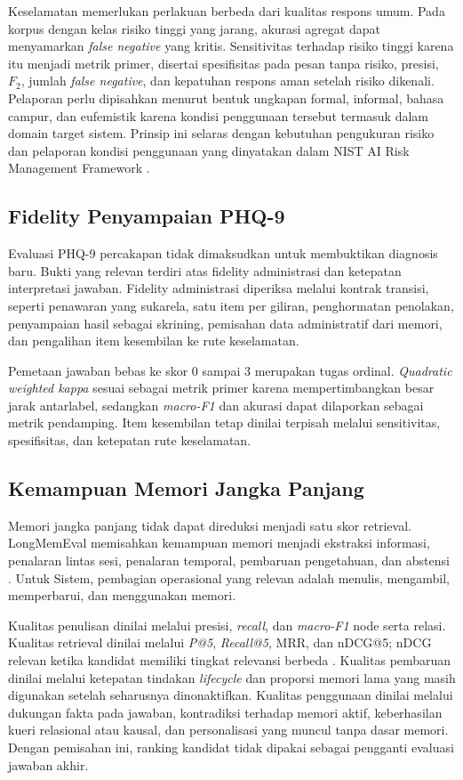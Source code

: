 Keselamatan memerlukan perlakuan berbeda dari kualitas respons umum. Pada korpus dengan kelas risiko tinggi yang jarang, akurasi agregat dapat menyamarkan \textit{false negative} yang kritis. Sensitivitas terhadap risiko tinggi karena itu menjadi metrik primer, disertai spesifisitas pada pesan tanpa risiko, presisi, $F_2$, jumlah \textit{false negative}, dan kepatuhan respons aman setelah risiko dikenali. Pelaporan perlu dipisahkan menurut bentuk ungkapan formal, informal, bahasa campur, dan eufemistik karena kondisi penggunaan tersebut termasuk dalam domain target sistem. Prinsip ini selaras dengan kebutuhan pengukuran risiko dan pelaporan kondisi penggunaan yang dinyatakan dalam NIST AI Risk Management Framework \parencite{nistAirmf2023}.

\subsection{Fidelity Penyampaian PHQ-9}

Evaluasi PHQ-9 percakapan tidak dimaksudkan untuk membuktikan diagnosis baru. Bukti yang relevan terdiri atas fidelity administrasi dan ketepatan interpretasi jawaban. Fidelity administrasi diperiksa melalui kontrak transisi, seperti penawaran yang sukarela, satu item per giliran, penghormatan penolakan, penyampaian hasil sebagai skrining, pemisahan data administratif dari memori, dan pengalihan item kesembilan ke rute keselamatan.

Pemetaan jawaban bebas ke skor 0 sampai 3 merupakan tugas ordinal. \textit{Quadratic weighted kappa} sesuai sebagai metrik primer karena mempertimbangkan besar jarak antarlabel, sedangkan \textit{macro-F1} dan akurasi dapat dilaporkan sebagai metrik pendamping. Item kesembilan tetap dinilai terpisah melalui sensitivitas, spesifisitas, dan ketepatan rute keselamatan.

\subsection{Kemampuan Memori Jangka Panjang}

Memori jangka panjang tidak dapat direduksi menjadi satu skor retrieval. LongMemEval memisahkan kemampuan memori menjadi ekstraksi informasi, penalaran lintas sesi, penalaran temporal, pembaruan pengetahuan, dan abstensi \parencite{wu2024longmemeval}. Untuk Sistem, pembagian operasional yang relevan adalah menulis, mengambil, memperbarui, dan menggunakan memori.

Kualitas penulisan dinilai melalui presisi, \textit{recall}, dan \textit{macro-F1} node serta relasi. Kualitas retrieval dinilai melalui \textit{P@5}, \textit{Recall@5}, MRR, dan nDCG@5; nDCG relevan ketika kandidat memiliki tingkat relevansi berbeda \parencite{jarvelin2002cumulated}. Kualitas pembaruan dinilai melalui ketepatan tindakan \textit{lifecycle} dan proporsi memori lama yang masih digunakan setelah seharusnya dinonaktifkan. Kualitas penggunaan dinilai melalui dukungan fakta pada jawaban, kontradiksi terhadap memori aktif, keberhasilan kueri relasional atau kausal, dan personalisasi yang muncul tanpa dasar memori. Dengan pemisahan ini, ranking kandidat tidak dipakai sebagai pengganti evaluasi jawaban akhir.


